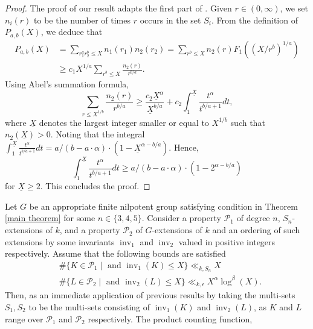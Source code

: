 \documentclass[11pt]{amsart}
\newcommand{\op}[1]{\operatorname{#1}}
\numberwithin{equation}{section}
\begin{document}
\begin{proof}
    The proof of our result adapts the first part of \cite[Lemma 3.2]{Wang2020}. Given $r \in (0,\infty)$, we set $n_i(r)$ to be the number of times $r$ occurs in the set $S_i$. From the definition of $P_{a,b}(X)$, we deduce that
    \begin{equation}
        \begin{split}
            P_{a,b}(X) &= \sum_{r_1^ar_2^b \leq X} n_1(r_1)n_2(r_2) = \sum_{r^b\leq X} n_2(r)F_1((X/r^b)^{1/a})\\
             &\geq c_1 X^{1/a} \sum_{r^b\leq X} \frac{n_2(r)}{r^{b/a}}.
        \end{split}
    \end{equation}
Using Abel's summation formula,
\[
\sum_{r\leq X^{1/b}} \frac{n_2(r)}{r^{b/a}} \geq \frac{c_2\underline{X}^{\alpha}}{\underline{X}^{b/a}}+c_2\int_1^{\underline{X}}\frac{t^{\alpha}}{t^{b/a+1}}dt,
\]
where $\underline{X}$ denotes the largest integer smaller or equal to $X^{1/b}$ such that $n_2(\underline{X}) > 0$. Noting that the integral $\int_1^{\underline{X}}\frac{t^{\alpha}}{t^{b/a+1}}dt = a/(b-a\cdot\alpha)\cdot(1-\underline{X}^{\alpha - b/a})$. Hence, \[\int_1^{\underline{X}}\frac{t^{\alpha}}{t^{b/a+1}}dt \geq a/(b-a\cdot\alpha)\cdot(1-2^{\alpha - b/a})\] for $\underline{X} \geq 2$. This concludes the proof.
\end{proof}
Let $G$ be an appropriate finite nilpotent group satisfying condition in Theorem \ref{main theorem} for some $n \in \{3,4,5\}$. Consider a property $\mathcal{P}_1$ of degree $n$, $S_n$-extensions of $k$, and a property $\mathcal{P}_2$ of $G$-extensions of $k$ and an ordering of such extensions by some invariants $\op{inv}_1$ and $\op{inv}_2$ valued in positive integers respectively. Assume that the following bounds are satisfied
\begin{equation}\label{upper bound P_1 and P_2}
    \begin{split}
        & \#\{K\in \mathcal{P}_1\mid  \text{ and }\op{inv}_1(K) \leq X\} \ll_{k, S_n} X\\
        & \#\{L\in \mathcal{P}_2\mid  \text{ and }\op{inv}_2(L) \leq X\} \ll_{k, \epsilon} X^{\alpha}\log^{\beta}(X).
    \end{split}
\end{equation}
Then, as an immediate application of previous results by taking the multi-sets $S_1, S_2$ to be the multi-sets consisting of $\op{inv}_1(K)$ and $\op{inv}_2(L)$, as $K$ and $L$ range over $\mathcal{P}_1$ and $\mathcal{P}_2$ respectively. The product counting function,
\end{document}
